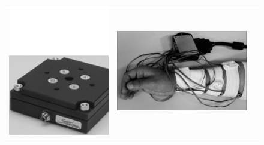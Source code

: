 \begin{figure}[!t] \centering
  \begin{tabular}{ccc}
    \includegraphics[height=0.16\textheight]{figs/OFTS} &
    \includegraphics[height=0.16\textheight]{figs/setup} &

\end{tabular}
\end{figure}
